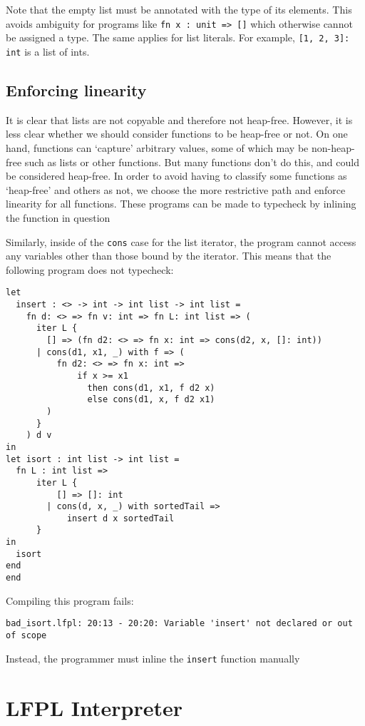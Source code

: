 \documentclass[12pt]{article}
\newcommand{\code}{\lstinline}
\begin{document}
Note that the empty list must be annotated with the type of its elements. This avoids ambiguity for programs like \code|fn x : unit => []| which otherwise cannot be assigned a type. The same applies for list literals. For example, \code|[1, 2, 3]: int| is a list of ints. 

\subsection{Enforcing linearity}

It is clear that lists are not copyable and therefore not heap-free. However, it is less clear whether we should consider functions to be heap-free or not. On one hand, functions can `capture' arbitrary values, some of which may be non-heap-free such as lists or other functions. But many functions don't do this, and could be considered heap-free. In order to avoid having to classify some functions as `heap-free' and others as not, we choose the more restrictive path and enforce linearity for all functions. These programs can be made to typecheck by inlining the function in question

Similarly, inside of the \code|cons| case for the list iterator, the program cannot access any variables other than those bound by the iterator. This means that the following program does not typecheck:
\begin{lstlisting}
let 
  insert : <> -> int -> int list -> int list =
    fn d: <> => fn v: int => fn L: int list => (
      iter L { 
        [] => (fn d2: <> => fn x: int => cons(d2, x, []: int))
      | cons(d1, x1, _) with f => (
          fn d2: <> => fn x: int => 
              if x >= x1 
                then cons(d1, x1, f d2 x)
                else cons(d1, x, f d2 x1)
        )
      }
    ) d v 
in
let isort : int list -> int list = 
  fn L : int list => 
      iter L {
          [] => []: int
        | cons(d, x, _) with sortedTail => 
            insert d x sortedTail 
      }
in 
  isort 
end
end
\end{lstlisting}
Compiling this program fails:
\begin{lstlisting}[numbers=none]
bad_isort.lfpl: 20:13 - 20:20: Variable 'insert' not declared or out of scope
\end{lstlisting}
Instead, the programmer must inline the \code|insert| function manually

\section{LFPL Interpreter}
\end{document}
